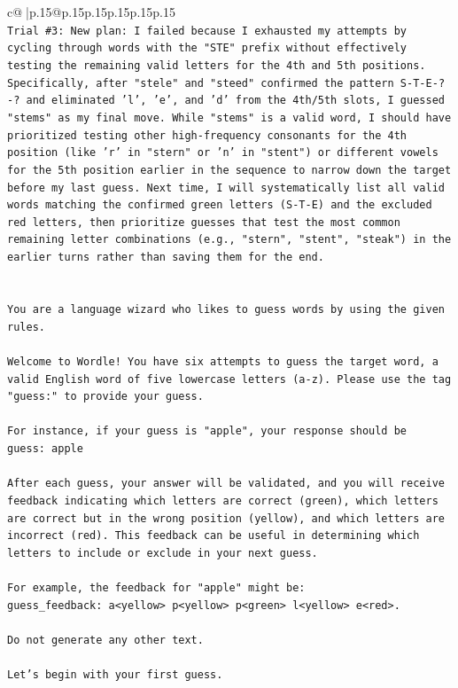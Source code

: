 \documentclass{article}
\begin{document}
{\begin{supertabular}{c@{$\;$}|p{.15\linewidth}@{}p{.15\linewidth}p{.15\linewidth}p{.15\linewidth}p{.15\linewidth}p{.15\linewidth}}
{{{\\ 
\texttt{Trial \#3: New plan: I failed because I exhausted my attempts by cycling through words with the "STE" prefix without effectively testing the remaining valid letters for the 4th and 5th positions. Specifically, after "stele" and "steed" confirmed the pattern S{-}T{-}E{-}?{-}? and eliminated 'l', 'e', and 'd' from the 4th/5th slots, I guessed "stems" as my final move. While "stems" is a valid word, I should have prioritized testing other high{-}frequency consonants for the 4th position (like 'r' in "stern" or 'n' in "stent") or different vowels for the 5th position earlier in the sequence to narrow down the target before my last guess. Next time, I will systematically list all valid words matching the confirmed green letters (S{-}T{-}E) and the excluded red letters, then prioritize guesses that test the most common remaining letter combinations (e.g., "stern", "stent", "steak") in the earlier turns rather than saving them for the end.} \\
\\ 
\\ 
\texttt{You are a language wizard who likes to guess words by using the given rules.} \\
\\ 
\texttt{Welcome to Wordle! You have six attempts to guess the target word, a valid English word of five lowercase letters (a{-}z). Please use the tag "guess:" to provide your guess.} \\
\\ 
\texttt{For instance, if your guess is "apple", your response should be} \\
\texttt{guess: apple} \\
\\ 
\texttt{After each guess, your answer will be validated, and you will receive feedback indicating which letters are correct (green), which letters are correct but in the wrong position (yellow), and which letters are incorrect (red). This feedback can be useful in determining which letters to include or exclude in your next guess.} \\
\\ 
\texttt{For example, the feedback for "apple" might be:} \\
\texttt{guess\_feedback: a<yellow> p<yellow> p<green> l<yellow> e<red>.} \\
\\ 
\texttt{Do not generate any other text.} \\
\\ 
\texttt{Let's begin with your first guess.} \\
            }
        }
    }
     \\ \\


\end{supertabular}}
\end{document}

